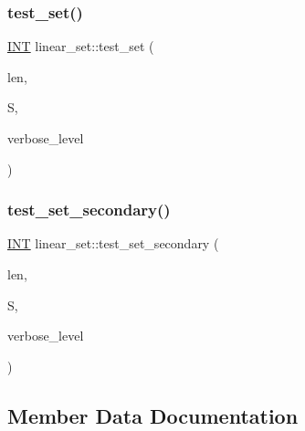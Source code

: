 \mbox{\label{classlinear__set_a97889354edd601521757f8ae6fc1ee36}} 
\subsubsection{\texorpdfstring{test\+\_\+set()}{test\_set()}}
{\footnotesize\ttfamily \mbox{\hyperlink{galois_8h_a09fddde158a3a20bd2dcadb609de11dc}{I\+NT}} linear\+\_\+set\+::test\+\_\+set (\begin{DoxyParamCaption}\item[{\mbox{\hyperlink{galois_8h_a09fddde158a3a20bd2dcadb609de11dc}{I\+NT}}}]{len,  }\item[{\mbox{\hyperlink{galois_8h_a09fddde158a3a20bd2dcadb609de11dc}{I\+NT}} $\ast$}]{S,  }\item[{\mbox{\hyperlink{galois_8h_a09fddde158a3a20bd2dcadb609de11dc}{I\+NT}}}]{verbose\+\_\+level }\end{DoxyParamCaption})}

\mbox{\label{classlinear__set_ad0b62cd593ae6cf8061a5f77c7d2ac07}} 
\subsubsection{\texorpdfstring{test\+\_\+set\+\_\+secondary()}{test\_set\_secondary()}}
{\footnotesize\ttfamily \mbox{\hyperlink{galois_8h_a09fddde158a3a20bd2dcadb609de11dc}{I\+NT}} linear\+\_\+set\+::test\+\_\+set\+\_\+secondary (\begin{DoxyParamCaption}\item[{\mbox{\hyperlink{galois_8h_a09fddde158a3a20bd2dcadb609de11dc}{I\+NT}}}]{len,  }\item[{\mbox{\hyperlink{galois_8h_a09fddde158a3a20bd2dcadb609de11dc}{I\+NT}} $\ast$}]{S,  }\item[{\mbox{\hyperlink{galois_8h_a09fddde158a3a20bd2dcadb609de11dc}{I\+NT}}}]{verbose\+\_\+level }\end{DoxyParamCaption})}



\subsection{Member Data Documentation}
\mbox{\label{classlinear__set_a5cb29e2f816926ef4adc82a7467e83f6}} 
